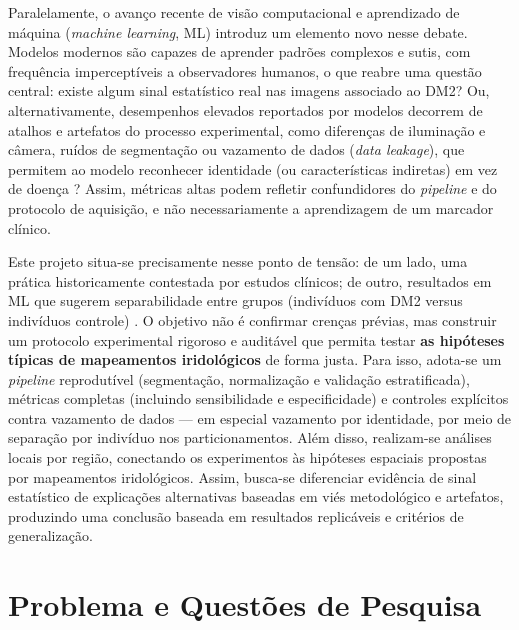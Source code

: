 \documentclass[11pt,a4paper]{article}
\begin{document}
Paralelamente, o avanço recente de visão computacional e aprendizado de máquina (\textit{machine learning}, ML) introduz um elemento novo nesse debate. Modelos modernos são capazes de aprender padrões complexos e sutis, com frequência imperceptíveis a observadores humanos, o que reabre uma questão central: existe algum sinal estatístico real nas imagens associado ao DM2? Ou, alternativamente, desempenhos elevados reportados por modelos decorrem de atalhos e artefatos do processo experimental, como diferenças de iluminação e câmera, ruídos de segmentação ou vazamento de dados (\textit{data leakage}), que permitem ao modelo reconhecer identidade (ou características indiretas) em vez de doença \citep{SamantAgarwal2018CMPB}? Assim, métricas altas podem refletir confundidores do \textit{pipeline} e do protocolo de aquisição, e não necessariamente a aprendizagem de um marcador clínico.

Este projeto situa-se precisamente nesse ponto de tensão: de um lado, uma prática historicamente contestada por estudos clínicos; de outro, resultados em ML que sugerem separabilidade entre grupos (indivíduos com DM2 versus indivíduos controle) \citep{SamantAgarwal2018CMPB}. O objetivo não é confirmar crenças prévias, mas construir um protocolo experimental rigoroso e auditável que permita testar \textbf{as hipóteses típicas de mapeamentos iridológicos} de forma justa. Para isso, adota-se um \textit{pipeline} reprodutível (segmentação, normalização e validação estratificada), métricas completas (incluindo sensibilidade e especificidade) e controles explícitos contra vazamento de dados --- em especial vazamento por identidade, por meio de separação por indivíduo nos particionamentos. Além disso, realizam-se análises locais por região, conectando os experimentos às hipóteses espaciais propostas por mapeamentos iridológicos. Assim, busca-se diferenciar evidência de sinal estatístico de explicações alternativas baseadas em viés metodológico e artefatos, produzindo uma conclusão baseada em resultados replicáveis e critérios de generalização.


\section{Problema e Questões de Pesquisa}
\end{document}

